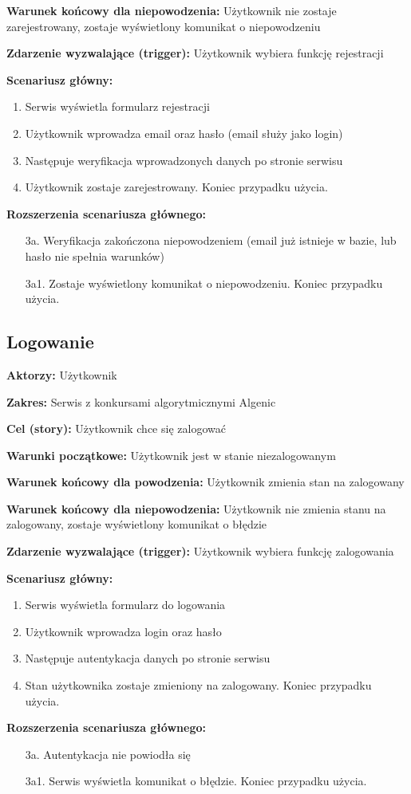 \documentclass{article}
\begin{document}
\textbf{Warunek końcowy dla niepowodzenia:} Użytkownik nie zostaje zarejestrowany, zostaje wyświetlony komunikat o niepowodzeniu

\textbf{Zdarzenie wyzwalające (trigger):} Użytkownik wybiera funkcję rejestracji

\textbf{Scenariusz główny:}
\begin{enumerate}
	\item Serwis wyświetla formularz rejestracji
	\item Użytkownik wprowadza email oraz hasło (email służy jako login)
	\item Następuje weryfikacja wprowadzonych danych po stronie serwisu
	\item Użytkownik zostaje zarejestrowany. Koniec przypadku użycia.
\end{enumerate}

\textbf{Rozszerzenia scenariusza głównego:}
\begin{itemize}
	\item[3a.] Weryfikacja zakończona niepowodzeniem (email już istnieje w bazie, lub hasło nie spełnia warunków)
	\item[3a1.] Zostaje wyświetlony komunikat o niepowodzeniu. Koniec przypadku użycia.
\end{itemize}

\subsection{Logowanie}

\textbf{Aktorzy:} Użytkownik

\textbf{Zakres:} Serwis z konkursami algorytmicznymi Algenic

\textbf{Cel (story):} Użytkownik chce się zalogować

\textbf{Warunki początkowe:} Użytkownik jest w stanie niezalogowanym

\textbf{Warunek końcowy dla powodzenia:} Użytkownik zmienia stan na zalogowany

\textbf{Warunek końcowy dla niepowodzenia:} Użytkownik nie zmienia stanu na zalogowany, zostaje wyświetlony komunikat o błędzie

\textbf{Zdarzenie wyzwalające (trigger):} Użytkownik wybiera funkcję zalogowania

\textbf{Scenariusz główny:}
\begin{enumerate}
	\item Serwis wyświetla formularz do logowania
	\item Użytkownik wprowadza login oraz hasło
	\item Następuje autentykacja danych po stronie serwisu
	\item Stan użytkownika zostaje zmieniony na zalogowany. Koniec przypadku użycia.
\end{enumerate}

\textbf{Rozszerzenia scenariusza głównego:}
\begin{itemize}
	\item[3a.] Autentykacja nie powiodła się
	\item[3a1.] Serwis wyświetla komunikat o błędzie. Koniec przypadku użycia.
\end{itemize}
\end{document}

